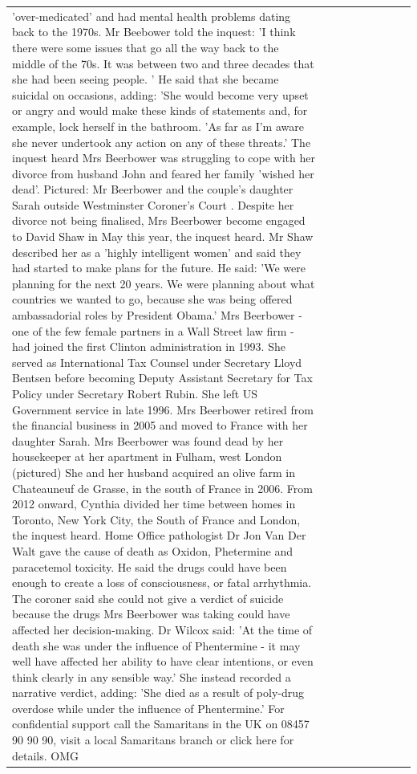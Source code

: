 \begin{table}[H]
\begin{tabular}{lllrlllll}
'over-medicated' and had mental health problems dating back to the 1970s. Mr Beebower told the inquest: 'I think there were some issues that go all the way back to the middle of the 70s. It was between two and three decades that she had been seeing people. ' He said that she became suicidal on occasions, adding: 'She would become very upset or angry and would make these kinds of statements and, for example, lock herself in the bathroom. 'As far as I'm aware she never undertook any action on any of these threats.' The inquest heard Mrs Beerbower was struggling to cope with her divorce from husband John and feared her family 'wished her dead'. Pictured: Mr Beerbower and the couple's daughter Sarah outside Westminster Coroner's Court . Despite her divorce not being finalised, Mrs Beerbower become engaged to David Shaw in May this year, the inquest heard. Mr Shaw described her as a 'highly intelligent women' and said they had started to make plans for the future. He said: 'We were planning for the next 20 years. We were planning about what countries we wanted to go, because she was being offered ambassadorial roles by President Obama.' Mrs Beerbower - one of the few female partners in a Wall Street law firm - had joined the first Clinton administration in 1993. She served as International Tax Counsel under Secretary Lloyd Bentsen before becoming Deputy Assistant Secretary for Tax Policy under Secretary Robert Rubin. She left US Government service in late 1996. Mrs Beerbower retired from the financial business in 2005 and moved to France with her daughter Sarah. Mrs Beerbower was found dead by her housekeeper at her apartment in Fulham, west London (pictured) She and her husband acquired an olive farm in Chateauneuf de Grasse, in the south of France in 2006. From 2012 onward, Cynthia divided her time between homes in Toronto, New York City, the South of France and London, the inquest heard. Home Office pathologist Dr Jon Van Der Walt gave the cause of death as Oxidon, Phetermine and paracetemol toxicity. He said the drugs could have been enough to create a loss of consciousness, or fatal arrhythmia. The coroner said she could not give a verdict of suicide because the drugs Mrs Beerbower was taking could have affected her decision-making. Dr Wilcox said: 'At the time of death she was under the influence of Phentermine - it may well have affected her ability to have clear intentions, or even think clearly in any sensible way.' She instead recorded a narrative verdict, adding: 'She died as a result of poly-drug overdose while under the influence of Phentermine.' For confidential support call the Samaritans in the UK on 08457 90 90 90, visit a local Samaritans branch or click here for details. OMG \\

\end{tabular}
\end{table}

